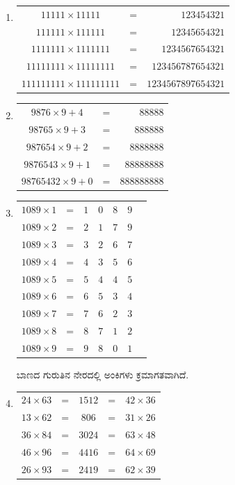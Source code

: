 \begin{enumerate}
\item 

\smallskip
\begin{tabular}[t]{ccr}
$11111 \times 11111$ & = & $123454321$\\
$111111 \times 111111$ & = & $12345654321$\\
$1111111 \times 1111111$ & = & $1234567654321$\\
$11111111 \times 11111111$ & = & $123456787654321$\\
$111111111 \times 111111111$ & = & $1234567897654321$\\
\end{tabular}

\item 

\smallskip
\begin{tabular}[t]{ccr}
$9876 \times 9 + 4$ & = & $88888$\\
$98765 \times 9 + 3$ & = & $888888$\\
$987654 \times 9 + 2$ & = & $8888888$\\
$9876543 \times 9 + 1$& = & $88888888$\\
$98765432 \times 9 + 0$ & = & $888888888$
\end{tabular}

\item 

\smallskip
\begin{tabular}[t]{ccccccc}
$1089 \times 1$ & = & $1$&$0$&$8$&$9$\\
$1089 \times 2$ & = & $2$&$1$&$7$&$9$\\
$1089 \times 3$ & = & $3$&$2$&$6$&$7$\\
$1089 \times 4$ & = & $4$&$3$&$5$&$6$\\
$1089 \times 5$ & = & $5$&$4$&$4$&$5$\\
$1089 \times 6$ & = & $6$&$5$&$3$&$4$\\
$1089 \times 7$ & = & $7$&$6$&$2$&$3$\\
$1089 \times 8$ & = & $8$&$7$&$1$&$2$\\
$1089 \times 9$ & = & $9$&$8$&$0$&$1$
\end{tabular}

ಬಾಣದ ಗುರುತಿನ ನೇರದಲ್ಲಿ ಅಂಕಿಗಳು ಕ್ರಮಾಗತವಾಗಿದೆ. 

\item 
\begin{tabular}[t]{ccccc}
$24 \times 63$ & = & $1512$ & = & $42 \times 36$\\
$13 \times 62$ & = & $806$ & = & $31 \times 26$\\
$36 \times 84$ & = & $3024$ & = & $63 \times 48$\\
$46 \times 96$ & = & $4416$ & = & $64 \times 69$\\
$26 \times 93$ & = & $2419$ & = & $62 \times 39$\\
\end{tabular}


\end{enumerate}

